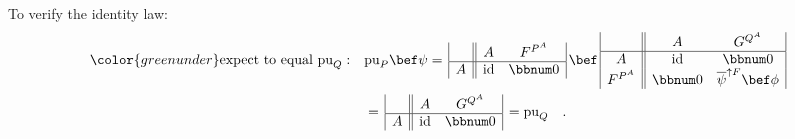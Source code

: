 To verify the identity law:
\begin{align*}
{\color{greenunder}\text{expect to equal }\text{pu}_{Q}:}\quad & \text{pu}_{P}\bef\psi=\,\begin{array}{|c||cc|}
 & A & F^{P^{A}}\\
\hline A & \text{id} & \bbnum 0
\end{array}\,\bef\,\begin{array}{|c||cc|}
 & A & G^{Q^{A}}\\
\hline A & \text{id} & \bbnum 0\\
F^{P^{A}} & \bbnum 0 & \overline{\psi}^{\uparrow F}\bef\phi
\end{array}\\
 & =\,\begin{array}{|c||cc|}
 & A & G^{Q^{A}}\\
\hline A & \text{id} & \bbnum 0
\end{array}\,=\text{pu}_{Q}\quad.
\end{align*}

